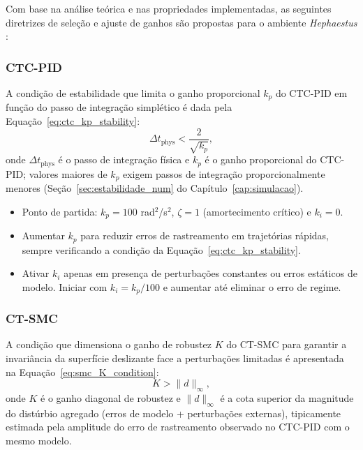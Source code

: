 Com base na análise teórica e nas propriedades implementadas, as seguintes diretrizes de seleção e ajuste de ganhos são propostas para o ambiente \textit{Hephaestus} \cite{astrom1995theory, slotine1991applied, gao2003scaling, han2009pid}:

\subsubsection*{CTC-PID}
A condição de estabilidade que limita o ganho proporcional $k_p$ do CTC-PID em função do passo de integração simplético é dada pela Equação~\eqref{eq:ctc_kp_stability}:
\begin{equation}
    \Delta t_{\text{phys}} < \frac{2}{\sqrt{k_p}},
    \label{eq:ctc_kp_stability}
\end{equation}
onde $\Delta t_{\text{phys}}$ é o passo de integração física e $k_p$ é o ganho proporcional do CTC-PID; valores maiores de $k_p$ exigem passos de integração proporcionalmente menores (Seção~\ref{sec:estabilidade_num} do Capítulo~\ref{cap:simulacao}).

\begin{itemize}
    \item Ponto de partida: $k_p = 100$ rad$^2$/s$^2$, $\zeta = 1$ (amortecimento crítico) e $k_i = 0$.
    \item Aumentar $k_p$ para reduzir erros de rastreamento em trajetórias rápidas, sempre verificando a condição da Equação~\eqref{eq:ctc_kp_stability}.
    \item Ativar $k_i$ apenas em presença de perturbações constantes ou erros estáticos de modelo. Iniciar com $k_i = k_p / 100$ e aumentar até eliminar o erro de regime.
\end{itemize}

\subsubsection*{CT-SMC}
A condição que dimensiona o ganho de robustez $K$ do CT-SMC para garantir a invariância da superfície deslizante face a perturbações limitadas \cite{slotine1991applied} é apresentada na Equação~\eqref{eq:smc_K_condition}:
\begin{equation}
    K > \|d\|_\infty,
    \label{eq:smc_K_condition}
\end{equation}
onde $K$ é o ganho diagonal de robustez e $\|d\|_\infty$ é a cota superior da magnitude do distúrbio agregado (erros de modelo + perturbações externas), tipicamente estimada pela amplitude do erro de rastreamento observado no CTC-PID com o mesmo modelo.

